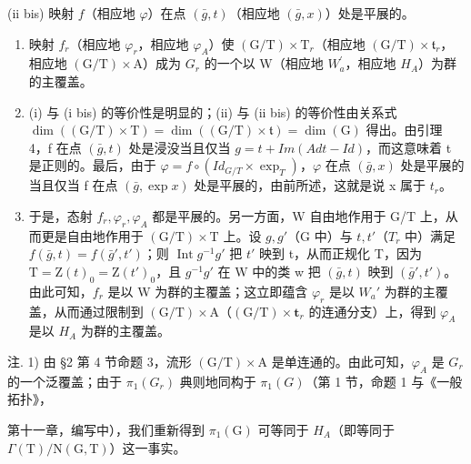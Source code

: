 (ii bis) 映射 \(f\)（相应地 \(\varphi\)）在点 \((\bar{g}, t)\)（相应地 \((\bar{g}, x)\)）处是平展的。

\begin{enumerate}
\def\labelenumi{\alph{enumi})}
\setcounter{enumi}{1}
\item
  映射 \(f_{r}\)（相应地 \(\varphi_{r}\)，相应地 \(\varphi_{A}\)）使 \((\mathrm{G}/\mathrm{T}) \times \mathrm{T}_{r}\)（相应地 \((\mathrm{G}/\mathrm{T}) \times \mathfrak{t}_{r}\)，相应地 \((\mathrm{G}/\mathrm{T}) \times \mathrm{A}\)）成为 \(G_{r}\) 的一个以 W（相应地 \(W_{a}^{\prime}\)，相应地 \(H_{A}\)）为群的主覆盖。
\item
  (i) 与 (i bis) 的等价性是明显的；(ii) 与 (ii bis) 的等价性由关系式 \(\dim((\mathrm{G}/\mathrm{T})\times\mathrm{T})=\dim((\mathrm{G}/\mathrm{T})\times\mathfrak{t})=\dim(\mathrm{G})\) 得出。由引理 4，f 在点 \((\bar{g},t)\) 处是浸没当且仅当 \(g=t+Im(Ad t-Id)\)，而这意味着 t 是正则的。最后，由于 \(\varphi=f\circ(Id_{G/T}\times\exp_{T})\)，\(\varphi\) 在点 \((\bar{g},x)\) 处是平展的当且仅当 f 在点 \((\bar{g},\exp x)\) 处是平展的，由前所述，这就是说 x 属于 \(t_{r}\)。
\item
  于是，态射 \(f_{r}, \varphi_{r}, \varphi_{A}\) 都是平展的。另一方面，W 自由地作用于 G/T 上，从而更是自由地作用于 \((\mathrm{G}/\mathrm{T}) \times \mathrm{T}\) 上。设 \(g, g'\)（G 中）与 \(t, t'\)（\(T_{r}\) 中）满足 \(f(\bar{g}, t) = f(\bar{g}', t')\)；则 \(\operatorname{Int} g^{-1} g'\) 把 \(t'\) 映到 t，从而正规化 T，因为 \(\mathrm{T} = \mathrm{Z}(t)_{0} = \mathrm{Z}(t')_{0}\)，且 \(g^{-1} g'\) 在 W 中的类 w 把 \((\bar{g}, t)\) 映到 \((\bar{g}', t')\)。由此可知，\(f_{r}\) 是以 W 为群的主覆盖；这立即蕴含 \(\varphi_{r}\) 是以 \(W_{a}'\) 为群的主覆盖，从而通过限制到 \((\mathrm{G}/\mathrm{T}) \times \mathrm{A}\)（\((\mathrm{G}/\mathrm{T}) \times \mathbf{t}_{r}\) 的连通分支）上，得到 \(\varphi_{A}\) 是以 \(H_{A}\) 为群的主覆盖。
\end{enumerate}

注. 1) 由 §2 第 4 节命题 3，流形 \((\mathrm{G}/\mathrm{T}) \times \mathrm{A}\) 是单连通的。由此可知，\(\varphi_{A}\) 是 \(G_{r}\) 的一个泛覆盖；由于 \(\pi_{1}(G_{r})\) 典则地同构于 \(\pi_{1}(G)\)（第 1 节，命题 1 与《一般拓扑》，

第十一章，编写中），我们重新得到 \(\pi_{1}(\mathrm{G})\) 可等同于 \(H_{A}\)（即等同于 \(\Gamma(\mathrm{T})/\mathrm{N}(\mathrm{G},\mathrm{T})\)）这一事实。

